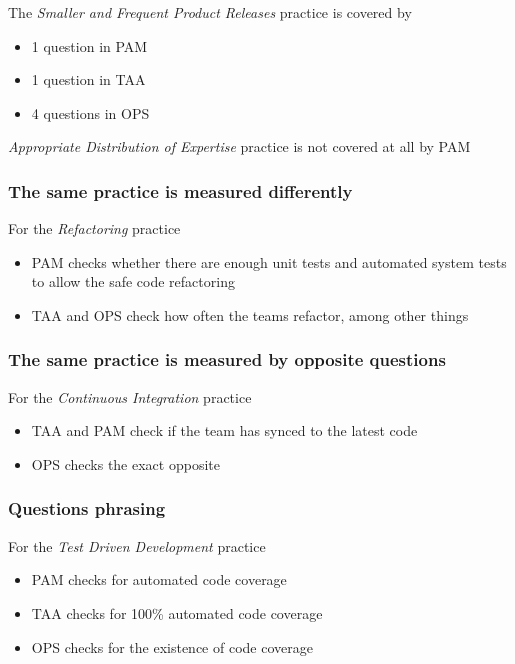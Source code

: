 The \textit{Smaller and Frequent Product Releases} practice is covered by

\begin{itemize}
	\item 1 question in PAM
	\item 1 question in TAA
	\item 4 questions in OPS
\end{itemize}

\textit{Appropriate Distribution of Expertise} practice is not covered at all by PAM

\clearpage

\subsubsection{The same practice is measured differently}

For the \textit{Refactoring} practice 

\begin{itemize}
	\item PAM checks whether there are enough unit tests and automated system tests to allow the safe code refactoring
	\item TAA and OPS check how often the teams refactor, among other things
\end{itemize}

\clearpage

\subsubsection{The same practice is measured by opposite questions}

For the \textit{Continuous Integration} practice

\begin{itemize}
	\item TAA and PAM check if the team has synced to the latest code
	\item OPS checks the exact opposite
\end{itemize}

\clearpage

\subsubsection{Questions phrasing}

For the \textit{Test Driven Development} practice

\begin{itemize}
	\item PAM checks for automated code coverage
	\item TAA checks for 100\% automated code coverage
	\item OPS checks for the existence of code coverage
\end{itemize}

